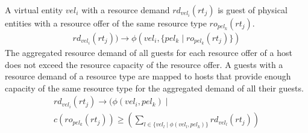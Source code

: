 \documentclass[conference]{IEEEtran}
\begin{document}
A virtual entity $vel_i$ with a resource demand $rd_{vel_i}(rt_j)$ is guest of physical entities with a resource offer of the same resource type $ro_{pel_k}(rt_j)$.
\begin{multline}
rd_{vel_i}(rt_j)) \rightarrow \phi(vel_i, \{ pel_k \mid ro_{pel_k}(rt_j)\})
\end{multline}
The aggregated resource demand of all guests for each resource offer of a host does not exceed the resource capacity of the resource offer.
A guests with a resource demand of a resource type are mapped to hosts that provide enough capacity of the same resource type for the aggregated demand of all their guests.
\begin{multline}
rd_{vel_i}(rt_j) \rightarrow ( \phi(vel_i, pel_k) \mid \\ c(ro_{pel_k}(rt_j)) \geq ( \sum_{l \in \{ vel_l \mid \phi(vel_l, pel_k) \}} rd_{vel_l}(rt_j)) 
\end{multline}

\end{document}
